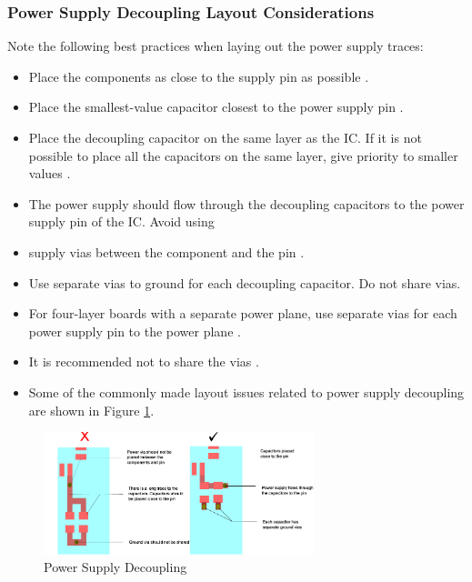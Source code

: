 \subsubsection{Power Supply Decoupling Layout Considerations\cite{AN91445}}
Note the following best practices when laying out the power supply traces:
\begin{itemize}
	\item Place the components as close to the supply pin as possible \cite{AN91445}.
	\item Place the smallest-value capacitor closest to the power supply pin \cite{AN91445}.
	\item Place the decoupling capacitor on the same layer as the IC. If it is not possible to place all the capacitors on the same layer, give priority to smaller values \cite{AN91445}.
	\item The power supply should flow through the decoupling capacitors to the power supply pin of the IC. Avoid using
	\item supply vias between the component and the pin \cite{AN91445}.
	\item Use separate vias to ground for each decoupling capacitor. Do not share vias\cite{AN91445}.
	\item For four-layer boards with a separate power plane, use separate vias for each power supply pin to the power plane \cite{AN91445}.
	\item It is recommended not to share the vias \cite{AN91445}.
	\item Some of the commonly made layout issues related to power supply decoupling are shown in \cite{AN91445} Figure \ref{fig:Power_Supply_Decoupling}.
\end{itemize}
\begin{figure}[h]
	\centering
	\includegraphics[width=0.7\textwidth]{Chap03/Figures/power_supply_coupling.PNG}
		\caption{Power Supply Decoupling}
		\label{fig:Power_Supply_Decoupling}
\end{figure}


